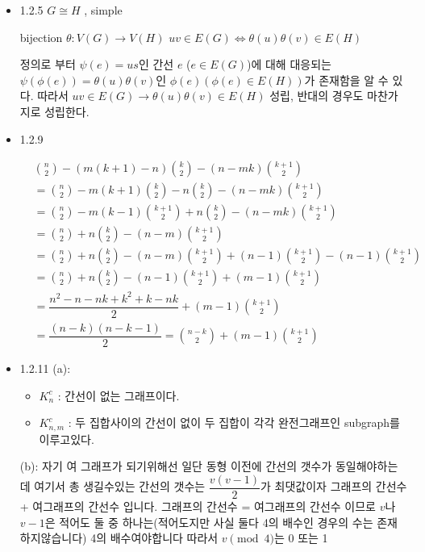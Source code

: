 \documentclass{oblivoir}
\begin{document}
\begin{itemize}

    \item 1.2.5
    $G \cong H$ , simple

    bijection $\theta : V(G) \longrightarrow V(H)$
    $ uv \in E(G) \Leftrightarrow  \theta(u)\theta(v) \in E(H)$

    정의로 부터 $\psi(e) = us$인 간선 $e$ ($e \in E(G)$)에 대해 대응되는 $\psi(\phi(e)) = \theta(u)\theta(v)$인 $\phi(e)(\phi(e) \in E(H))$가 존재함을 알 수 있다. 
    따라서 $ uv \in E(G) \rightarrow \theta(u)\theta(v) \in E(H)$ 성립, 반대의 경우도 마찬가지로 성립한다.
  
    \item 1.2.9
    
    \begin{align}
        &{n \choose 2} -  (m(k+1)-n) {k \choose 2} -(n-mk){k+1 \choose 2} \\
        &= {n \choose 2} -  m(k+1){k \choose 2}-n{k \choose 2} -(n-mk){k+1 \choose 2} \\
        &= {n \choose 2} -  m(k-1){k+1 \choose 2} +n{k \choose 2} -(n-mk){k+1 \choose 2} \\
        &= {n \choose 2} + n{k \choose 2} -(n-m){k+1 \choose 2} \\
        &= {n \choose 2} + n{k \choose 2} -(n-m){k+1 \choose 2} +(n-1){k+1 \choose 2} - (n-1){k+1 \choose 2}\\
        &= {n \choose 2} + n{k \choose 2} - (n-1){k+1 \choose 2} + (m-1){k+1 \choose 2}  \\
        &= \dfrac{n^2-n-nk + k^2+k-nk}{2}  + (m-1){k+1 \choose 2} \\
        &= \dfrac{(n-k)(n-k-1)}{2}={n-k \choose 2}  + (m-1){k+1 \choose 2}
    \end{align}
    
    \item 1.2.11
    (a):
    \begin{itemize}
        \item $K_{n}^{c}$ : 간선이 없는 그래프이다.
        \item $K_{n,m}^{c}$ : 두 집합사이의 간선이 없이 두 집합이 각각 완전그래프인 subgraph를 이루고있다.
    \end{itemize}
    (b): 자기 여 그래프가 되기위해선 일단 동형 이전에 간선의 갯수가 동일해야하는데 여기서 총 생길수있는 간선의 갯수는 
$\dfrac{v(v-1)}{2}$가 최댓값이자 그래프의 간선수 + 여그래프의 간선수 입니다. 그래프의 간선수 = 여그래프의 간선수 이므로 $v$나 $v-1$은 적어도 둘 중 하나는(적어도지만 사실 둘다 4의 배수인 경우의 수는 존재하지않습니다) 4의 배수여야합니다
    따라서 $v\pmod{4}$는 0 또는 1
    


\end{itemize}
\end{document}

